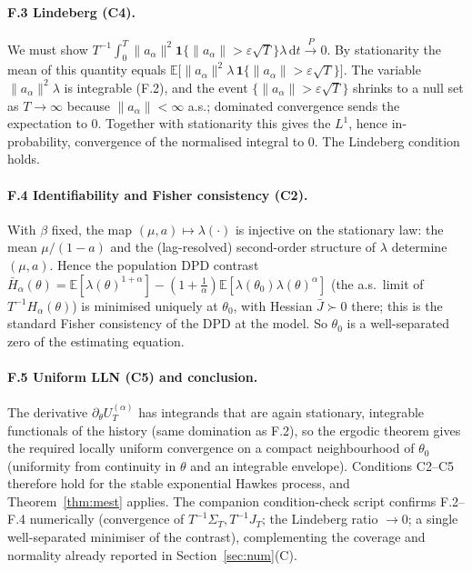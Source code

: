 \documentclass[smallextended,natbib]{svjour3}
\newcommand{\dd}{\,\mathrm{d}}
\newcommand{\E}{\mathbb{E}}
\newcommand{\toP}{\xrightarrow{P}}
\begin{document}
\paragraph{F.3 Lindeberg (C4).}
We must show $T^{-1}\int_0^T\|a_\alpha\|^2\mathbf 1\{\|a_\alpha\|>\varepsilon\sqrt T\}\lambda\dd t\toP0$.
By stationarity the mean of this quantity equals
$\E\big[\|a_\alpha\|^2\lambda\,\mathbf 1\{\|a_\alpha\|>\varepsilon\sqrt T\}\big]$.
The variable $\|a_\alpha\|^2\lambda$ is integrable (F.2), and the event
$\{\|a_\alpha\|>\varepsilon\sqrt T\}$ shrinks to a null set as $T\to\infty$ because
$\|a_\alpha\|<\infty$ a.s.; dominated convergence sends the expectation to $0$.
Together with stationarity this gives the $L^1$, hence in-probability, convergence
of the normalised integral to $0$. The Lindeberg condition holds.

\paragraph{F.4 Identifiability and Fisher consistency (C2).}
With $\beta$ fixed, the map $(\mu,a)\mapsto\lambda(\cdot)$ is injective on the
stationary law: the mean $\mu/(1-a)$ and the (lag-resolved) second-order structure
of $\lambda$ determine $(\mu,a)$. Hence the population DPD contrast
$\bar H_\alpha(\theta)=\E[\lambda(\theta)^{1+\alpha}]-(1+\tfrac1\alpha)\E[\lambda(\theta_0)\lambda(\theta)^{\alpha}]$
(the a.s.\ limit of $T^{-1}H_\alpha(\theta)$) is minimised uniquely at $\theta_0$,
with Hessian $\bar J\succ0$ there; this is the standard Fisher consistency of the
DPD at the model. So $\theta_0$ is a well-separated zero of the estimating equation.

\paragraph{F.5 Uniform LLN (C5) and conclusion.}
The derivative $\partial_\theta U_T^{(\alpha)}$ has integrands that are again
stationary, integrable functionals of the history (same domination as F.2), so the
ergodic theorem gives the required locally uniform convergence on a compact
neighbourhood of $\theta_0$ (uniformity from continuity in $\theta$ and an
integrable envelope). Conditions C2--C5 therefore hold for the stable exponential
Hawkes process, and Theorem~\ref{thm:mest} applies. The companion condition-check
script confirms F.2--F.4 numerically (convergence of $T^{-1}\Sigma_T,T^{-1}J_T$;
the Lindeberg ratio $\to0$; a single well-separated minimiser of the contrast),
complementing the coverage and normality already reported in Section~\ref{sec:num}(C).
\end{document}
